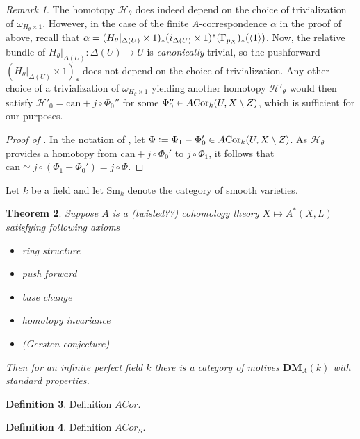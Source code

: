 \documentclass[a4paper, oneside, english,reqno]{amsart}
\DeclarePairedDelimiter{\ip}{\langle}{\rangle}
\theoremstyle{plain}
\newtheorem{theorem}{Theorem}[section]
\theoremstyle{definition}
\newtheorem{definition}[theorem]{Definition}
\theoremstyle{remark}
\newtheorem{remark}[theorem]{Remark}
\newcommand{\defeq}{\vcentcolon=}
\newcommand{\ACor}{A\mkern-3mu\Cor}
\newcommand{\scrH}{\mathscr{H}}
\newcommand{\Sm}{\mathrm{Sm}}
\newcommand{\can}{\mathrm{can}}
\newcommand{\DMA}{{\mathbf{DM}}_A}
\DeclareMathOperator{\Cor}{Cor}
\begin{document}
\begin{remark}
The homotopy $\scrH_\theta$ does indeed depend on the choice of trivialization of $\omega_{H_\theta\times1}$. However, in the case of the finite $A$-correspondence $\alpha$ in the proof of  above, recall that $\alpha=(H_{\theta}|_{\Delta(U)}\times1)_*(i_{\Delta(U)}\times1)^*(\Gamma_{p_X})_*(\ip1)$. Now, the relative bundle of $H_\theta|_{\Delta(U)}\colon\Delta(U)\to U$ is \emph{canonically} trivial, so the pushforward $(H_\theta|_{\Delta(U)}\times1)_*$ does not depend on the choice of trivialization. Any other choice of a trivialization of $\omega_{H_\theta\times1}$ yielding another homotopy $\scrH'_\theta$ would then satisfy $\scrH'_0=\can+j\circ\Phi_0''$ for some $\Phi_0''\in\ACor_k(U,X\setminus Z)$, which is sufficient for our purposes.
\end{remark}

\begin{proof}[Proof of ]
In the notation of , let $\Phi\defeq\Phi_1-\Phi_0'\in\ACor_k(U,X\setminus Z)$. As $\scrH_\theta$ provides a homotopy from $\can+j\circ\Phi_0'$ to $j\circ\Phi_1$, it follows that $\can\simeq j\circ(\Phi_1-\Phi_0')=j\circ\Phi$.
\end{proof}


\vspace{70pt}


Let $k$ be a field and let $\Sm_k$ denote the category of smooth varieties.

\begin{theorem}
Suppose $A$ is a (twisted??) cohomology theory $X\mapsto A^*(X,L)$ satisfying following axioms
\begin{itemize}
\item ring structure
\item push forward
\item base change
\item homotopy invariance
\item (Gersten conjecture)
\end{itemize}
Then for an infinite perfect field $k$ there is a category of motives $\DMA(k)$ with standard properties.
\end{theorem}

\begin{definition}
Definition $ACor$.
\end{definition}

\begin{definition}
Definition $ACor_S$.
\end{definition}
\end{document}
